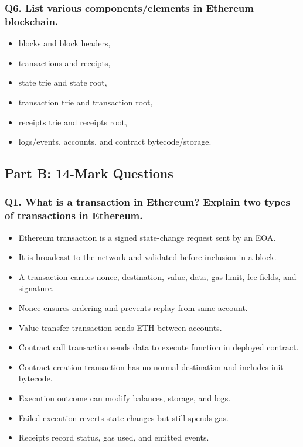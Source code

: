 \documentclass[12pt,a4paper]{article}
\begin{document}
\subsubsection*{Q6. List various components/elements in Ethereum blockchain.}
\begin{itemize}
\item blocks and block headers,
\item transactions and receipts,
\item state trie and state root,
\item transaction trie and transaction root,
\item receipts trie and receipts root,
\item logs/events, accounts, and contract bytecode/storage.
\end{itemize}

\subsection{Part B: 14-Mark Questions}

\subsubsection*{Q1. What is a transaction in Ethereum? Explain two types of transactions in Ethereum.}
\begin{itemize}
\item Ethereum transaction is a signed state-change request sent by an EOA.
\item It is broadcast to the network and validated before inclusion in a block.
\item A transaction carries nonce, destination, value, data, gas limit, fee fields, and signature.
\item Nonce ensures ordering and prevents replay from same account.
\item Value transfer transaction sends ETH between accounts.
\item Contract call transaction sends data to execute function in deployed contract.
\item Contract creation transaction has no normal destination and includes init bytecode.
\item Execution outcome can modify balances, storage, and logs.
\item Failed execution reverts state changes but still spends gas.
\item Receipts record status, gas used, and emitted events.
\end{itemize}
\end{document}
